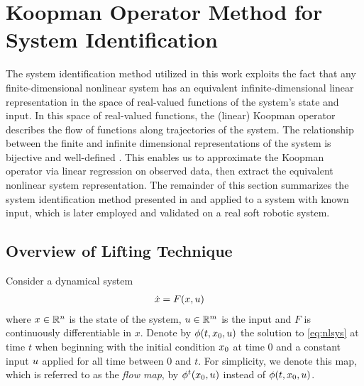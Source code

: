 \section{Koopman Operator Method for \\ System Identification}
\label{sec:theory}

The system identification method utilized in this work exploits the fact that any finite-dimensional nonlinear system has an equivalent infinite-dimensional linear representation in the space of real-valued functions of the system's state and input.
In this space of real-valued functions, the (linear) Koopman operator describes the flow of functions along trajectories of the system.
The relationship between the finite and infinite dimensional representations of the system is bijective and well-defined \cite{lasota2013chaos}.
This enables us to approximate the Koopman operator via linear regression on observed data, then extract the equivalent nonlinear system representation.
The remainder of this section summarizes the system identification method presented in \cite{mauroy2016linear} and \cite{mauroy2017koopman} applied to a system with known input, which is later employed and validated on a real soft robotic system.


\subsection{Overview of Lifting Technique}

Consider a dynamical system
\begin{align}
    \dot{x} &= F(x,u)    \label{eq:nlsys}
\end{align}
where $x \in \mathbb{R}^n$ is the state of the system, $u \in \mathbb{R}^m$ is the input and ${F}$ is continuously differentiable in $x$.
Denote by $\phi(t,x_0,u)$ the solution to \eqref{eq:nlsys} at time $t$ when beginning with the initial condition $x_0$ at time $0$ and a constant input $u$ applied for all time between $0$ and $t$.
For simplicity, we denote this map, which is referred to as the \emph{flow map}, by $\phi^t (x_0, u)$ instead of $\phi (t, x_0, u)$.

